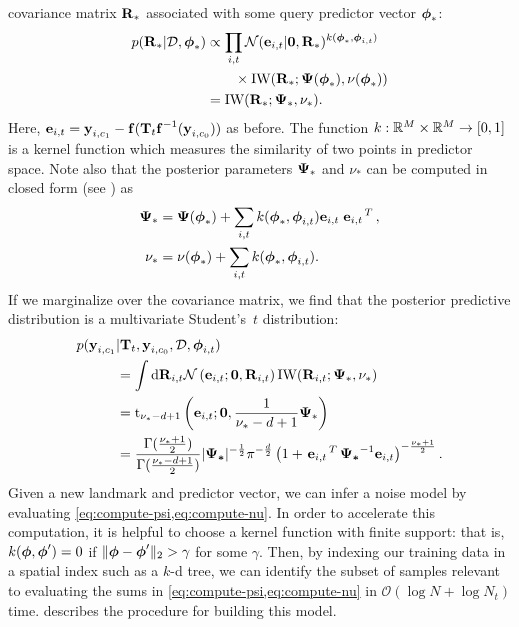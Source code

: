 covariance matrix $\boldsymbol{\mathbf{R}}_*$ associated with some query
predictor vector $\boldsymbol{\mathbf{\phi}}_*$:
\begin{align}
  p(\boldsymbol{\mathbf{R}}_*|\mathcal{D}, \boldsymbol{\mathbf{\phi}}_*) &\propto
    \prod_{i,t}\mathcal{N}(\boldsymbol{\mathbf{e}}_{i,t} \vert \boldsymbol{\mathbf{0}},
      \boldsymbol{\mathbf{R}}_*)^{k(\boldsymbol{\mathbf{\phi}}_*,\boldsymbol{\mathbf{\phi}}_{i,t})} \nonumber
      \\
      &\qquad\times\text{IW}(\boldsymbol{\mathbf{R}}_*;\boldsymbol{\mathbf{\Psi}}(\boldsymbol{\mathbf{\phi}}_*),
      \nu(\boldsymbol{\mathbf{\phi}}_*)) \\
      &=\text{IW}(\boldsymbol{\mathbf{R}}_*;\boldsymbol{\mathbf{\Psi}}_*, \nu_*). 
\end{align}
Here, $\boldsymbol{\mathbf{e}}_{i,t}= \boldsymbol{\mathbf{y}}_{i, c_1} - \boldsymbol{\mathbf{f}}(
\boldsymbol{\mathbf{T}}_t \boldsymbol{\mathbf{f}}^{-1}( \boldsymbol{\mathbf{y}}_{i, c_0} ))$ as before.  
The function $k: \RealNumbers[M]\times\RealNumbers[M]\to[0,1]$ is a kernel
function which measures the similarity of two points in predictor space.
Note also that the posterior parameters $\boldsymbol{\mathbf{\Psi}}_*$ and $\nu_*$ can be
computed in closed form  (see \cite{Vega-Brown2014-sb}) as
\begin{align}
  \boldsymbol{\mathbf{\Psi}}_* &= \boldsymbol{\mathbf{\Psi}}(\boldsymbol{\mathbf{\phi}}_*) + 
    \sum_{i,t} k(\boldsymbol{\mathbf{\phi}}_*,\boldsymbol{\mathbf{\phi}}_{i,t}) 
    \boldsymbol{\mathbf{e}}_{i,t}\left.{\boldsymbol{\mathbf{e}}_{i,t}}\right.^T, \label{eq:compute-psi}\\
  \nu_* &= \nu(\boldsymbol{\mathbf{\phi}}_*) + \sum_{i,t}
    k(\boldsymbol{\mathbf{\phi}}_*,\boldsymbol{\mathbf{\phi}}_{i,t}).  \label{eq:compute-nu}
\end{align}
If we marginalize over the covariance matrix, we find that the posterior
predictive distribution is a multivariate Student's~$t$ distribution:
\begin{align}
p(\boldsymbol{\mathbf{y}}_{i, c_1}&|  \boldsymbol{\mathbf{T}}_t,\boldsymbol{\mathbf{y}}_{i, c_0}, \mathcal{D},
  \boldsymbol{\mathbf{\phi}}_{i,t}) \\ &= \int \mathrm{d}\boldsymbol{\mathbf{R}}_{i,t}
  \mathcal{N}\left( \boldsymbol{\mathbf{e}}_{i,t}; \boldsymbol{\mathbf{0}},
    \boldsymbol{\mathbf{R}}_{i,t}\right)
  \text{IW}(\boldsymbol{\mathbf{R}}_{i,t};\boldsymbol{\mathbf{\Psi}}_*, \nu_*)  \\ &=
  \text{t}_{\nu_*-d+1}\left(
    \boldsymbol{\mathbf{e}}_{i,t}; \boldsymbol{\mathbf{0}}, \frac{1}{\nu_*-d+1}\boldsymbol{\mathbf{\Psi}}_*\right) \\ &=
    \frac{\Gamma(\frac{\nu_*+1}{2})}{\Gamma(\frac{\nu_*-d+1}{2})}
    \vert\boldsymbol{\mathbf{\Psi_*}}\vert^{-\frac{1}{2}}\pi^{-\frac{d}{2}} \left(1+
    \left.{\boldsymbol{\mathbf{e}}_{i,t}}\right.^T \boldsymbol{\mathbf{\Psi_*}}^{-1} \boldsymbol{\mathbf{e}}_{i,t}
  \right)^{-\frac{\nu_*+1}{2}}. 
\end{align}
Given a new landmark and predictor vector, we can infer a noise model by
evaluating \cref{eq:compute-psi,eq:compute-nu}.  In order to accelerate this
computation, it is helpful to choose a kernel function with finite support:
that is, $k(\boldsymbol{\mathbf{\phi}},\boldsymbol{\mathbf{\phi}}')=0$ if $\Vert\boldsymbol{\mathbf{\phi}} -
\boldsymbol{\mathbf{\phi}}'\Vert_2 > \gamma$ for some $\gamma$. Then, by indexing our training data in a spatial
index such as a $k$-d tree, we can identify the subset of samples relevant to
evaluating the sums in \cref{eq:compute-psi,eq:compute-nu} in $\mathcal{O}(\log
N + \log N_t)$ time.   describes the procedure for
building this model. 

